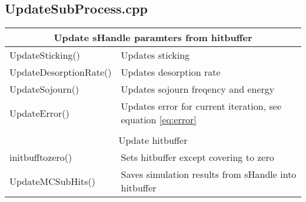 \subsection{UpdateSubProcess.cpp}

\begin{center}
\begin{tabular}{|l|l|}
\hline
\multicolumn{2}{|c|}{\rule{0pt}{3ex}Update sHandle paramters from hitbuffer}\\
\hline
\rule{0pt}{3ex} UpdateSticking()& Updates sticking\\
\rule{0pt}{3ex} UpdateDesorptionRate()& Updates desorption rate \\
\rule{0pt}{3ex} UpdateSojourn()& Updates sojourn freqency and energy \\
\rule{0pt}{3ex} UpdateError()& Updates  error for current iteration, see equation \ref{eq:error}\\
\hline
\multicolumn{2}{l}{}\\[1ex]
\hline
\multicolumn{2}{|c|}{\rule{0pt}{3ex}Update hitbuffer}\\
\hline
\rule{0pt}{3ex} initbufftozero()& Sets hitbuffer except covering to zero\\
\rule{0pt}{3ex} UpdateMCSubHits()& Saves simulation results from sHandle into hitbuffer\\
\hline
\end{tabular}
\end{center}

